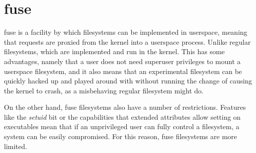 \documentclass[a4paper]{article}
\begin{document}
\section{\glsdesc*{fuse}}

\gls{fuse} is a facility by which filesystems can be implemented in userspace, meaning that requests are proxied from the kernel into a userspace process. Unlike regular filesystems, which are implemented and run in the kernel. This has some advantages, namely that a user does not need superuser privileges to mount a userspace filesystem, and it also means that an experimental filesystem can be quickly hacked up and played around with without running the change of causing the kernel to crash, as a misbehaving regular filesystem might do. 

On the other hand, \gls{fuse} filesystems also have a number of restrictions. Features like the \emph{setuid} bit or the capabilities that extended attributes allow setting on executables mean that if an unprivileged user can fully control a filesystem, a system can be easily compromised. For this reason, \gls{fuse} filesystems are more limited.

\printglossaries

\printbibliography
\end{document}

